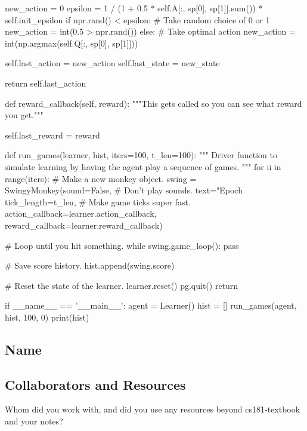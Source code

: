 \documentclass[submit]{harvardml}
\begin{document}
\begin{python}
        new_action = 0
        epsilon = 1 / (1 + 0.5 * self.A[:, sp[0], sp[1]].sum()) * self.init_epsilon
        if npr.rand() < epsilon:
            # Take random choice of 0 or 1
            new_action = int(0.5 > npr.rand())
        else:
            # Take optimal action
            new_action = int(np.argmax(self.Q[:, sp[0], sp[1]]))

        self.last_action = new_action
        self.last_state = new_state

        return self.last_action

    def reward_callback(self, reward):
        """This gets called so you can see what reward you get."""

        self.last_reward = reward


def run_games(learner, hist, iters=100, t_len=100):
    """
    Driver function to simulate learning by having the agent play a sequence of games.
    """
    for ii in range(iters):
        # Make a new monkey object.
        swing = SwingyMonkey(sound=False,  # Don't play sounds.
                             text="Epoch %
                             tick_length=t_len,  # Make game ticks super fast.
                             action_callback=learner.action_callback,
                             reward_callback=learner.reward_callback)

        # Loop until you hit something.
        while swing.game_loop():
            pass

        # Save score history.
        hist.append(swing.score)

        # Reset the state of the learner.
        learner.reset()
    pg.quit()
    return


if __name__ == '__main__':
    agent = Learner()
    hist = []
    run_games(agent, hist, 100, 0)
    print(hist)
\end{python}





\newpage
\newpage
\newpage
\subsection*{Name}
\subsection*{Collaborators and Resources}
Whom did you work with, and did you use any resources beyond cs181-textbook and your notes?
\end{document}
